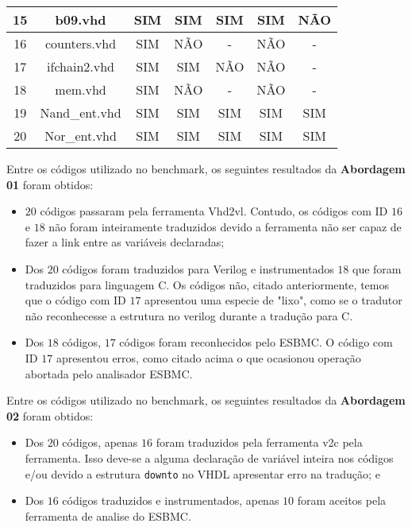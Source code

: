 \begin{table}[H]
\begin{tabular}{|c|c|c|c|c|c|c|}
15 & b09.vhd & SIM & SIM & SIM & SIM & NÃO \\ \hline
16 & counters.vhd & SIM & NÃO & - & NÃO & - \\ \hline
17 & ifchain2.vhd & SIM & SIM & NÃO & NÃO & - \\ \hline
18 & mem.vhd & SIM & NÃO & - & NÃO & - \\ \hline
19 & Nand\_ent.vhd & SIM & SIM & SIM & SIM & SIM \\ \hline
20 & Nor\_ent.vhd & SIM & SIM & SIM & SIM & SIM \\ \hline
\end{tabular}
\end{table}

\par
Entre os códigos utilizado no benchmark, os seguintes resultados da \textbf{Abordagem 01} foram obtidos:
\begin{itemize}
    \item $20$ códigos passaram pela ferramenta Vhd2vl. Contudo, os códigos com ID $16$ e $18$ não foram inteiramente traduzidos devido a ferramenta não ser capaz de fazer a link entre as variáveis declaradas; 
    \item Dos $20$ códigos foram traduzidos para Verilog e instrumentados $18$ que foram traduzidos para linguagem C. Os códigos não, citado anteriormente, temos que o código com ID $17$ apresentou uma especie de "lixo", como se o tradutor não reconhecesse a estrutura no verilog durante a tradução para C.
    \item Dos $18$ códigos, $17$ códigos foram reconhecidos pelo ESBMC. O código com ID $17$ apresentou erros, como citado acima o que ocasionou operação abortada pelo analisador ESBMC.
\end{itemize}

\par
Entre os códigos utilizado no benchmark, os seguintes resultados da \textbf{Abordagem 02} foram obtidos:
\begin{itemize}
    \item Dos $20$ códigos, apenas $16$ foram traduzidos pela ferramenta v2c
    pela ferramenta. Isso deve-se a alguma declaração de variável inteira nos códigos e/ou devido a estrutura \texttt{downto} no VHDL apresentar erro na tradução; e
    \item Dos $16$ códigos traduzidos e instrumentados, apenas $10$ foram aceitos pela ferramenta de analise do ESBMC.
\end{itemize}

